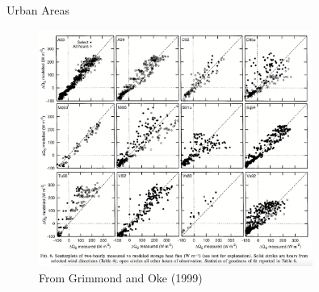 
\begin{frame}{Urban Areas}

\begin{figure}
\includegraphics[width=0.8\textwidth]{fig11}
\centering \tiny~\\From Grimmond and Oke (1999) 
\end{figure}
\end{frame}







